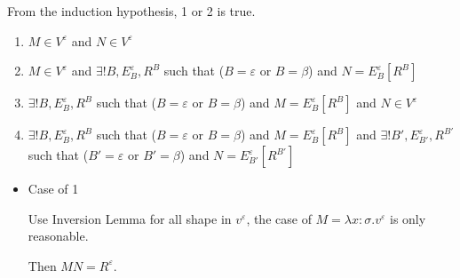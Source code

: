 \begin{itemize}
\begin{itemize}
	      	      From the induction hypothesis, 1 or 2 is true.
	      	      	      	      	      	      	      	      	      	      	      	      	      	      	      	      	      	      	      	      		      	      	      	      	      	      	      	      
	      	      \begin{enumerate}
	      	      	\item $ M \in V^\varepsilon$ and $ N \in V^\varepsilon$
	      	      	\item $ M \in V^\varepsilon$ and $\exists ! B, E^\varepsilon_B, R^B$ such that ($B = \varepsilon$ or $B = \beta$) and $N = E^\varepsilon_B[R^B]$
	      	      	\item $\exists ! B, E^\varepsilon_B, R^B$ such that ($B = \varepsilon$ or $B = \beta$) and $M = E^\varepsilon_B[R^B]$ and $ N \in V^\varepsilon$
	      	      	\item $\exists ! B, E^\varepsilon_B, R^B$ such that ($B = \varepsilon$ or $B = \beta$) and $M = E^\varepsilon_B[R^B]$ and $\exists ! B', E^\varepsilon_{B'}, R^{B'}$ such that ($B' = \varepsilon$ or $B' = \beta$) and $N = E^\varepsilon_{B'}[R^{B'}]$
	      	      \end{enumerate}
	      	      	      	      	      	      	      	      	      	      	      	      	      	      	      	      	      	      	      	      		      	      	      	      	      	      	      	      
	      	      \begin{itemize}
	      	      	\item Case of 1
	      	      	      	      	      	      	      	      	      	      	      	      	      	      	      	      	      	      	      	      	      	      	      	      	      	      	      	      	      	      		      	      	      	      	      	      	      	      	      	      	      	      
	      	      	      Use Inversion Lemma for all shape in $v^\varepsilon$, the case of $ M = \lambda x:\sigma.v^\varepsilon$ is only reasonable.
	      	      	      	      	      	      	      	      	      	      	      	      	      	      	      	      	      	      	      	      	      	      	      	      	      	      	      	      	      	      		      	      	      	      	      	      	      	      	      	      	      	      
	      	      	      Then $M N = R^\varepsilon$.
	      	      	      	      	      	      	      	      	      	      	      	      	      	      	      	      	      	      	      	      	      	      	      	      	      	      	      	      	      	      		      	      	      	      	      	      	      	      	      	      	      	      

\end{itemize}
\end{itemize}
\end{itemize}
